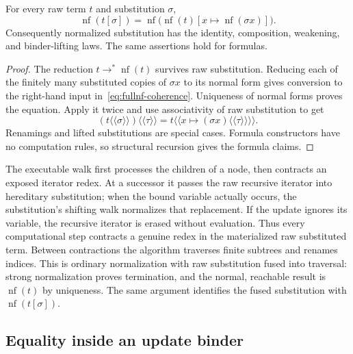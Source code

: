 \begin{lemma}
\label{lem:fullnf-substitution}
For every raw term $t$ and substitution $\sigma$,
\begin{equation}
 \operatorname{nf}(t[\sigma])
 =\operatorname{nf}\bigl(\operatorname{nf}(t)
                     [x\mapsto\operatorname{nf}(\sigma x)]\bigr).
\label{eq:fullnf-coherence}
\end{equation}
Consequently normalized substitution has the identity, composition,
weakening, and binder-lifting laws.  The same assertions hold for formulas.
\end{lemma}
\begin{proof}
The reduction $t\longrightarrow^*\operatorname{nf}(t)$ survives raw
substitution.  Reducing each of the finitely many substituted copies of
$\sigma x$ to its normal form gives conversion to the right-hand input
in~\eqref{eq:fullnf-coherence}.  Uniqueness of normal forms proves the
equation.  Apply it twice and use associativity of raw substitution to get
\[
 (t\langle\!\langle\sigma\rangle\!\rangle)
       \langle\!\langle\tau\rangle\!\rangle
 =t\langle\!\langle
          x\mapsto(\sigma x)\langle\!\langle\tau\rangle\!\rangle
       \rangle\!\rangle.
\]
Renamings and lifted substitutions are special cases.  Formula constructors
have no computation rules, so structural recursion gives the formula claims.
\end{proof}

The executable walk first processes the children of a node, then contracts
an exposed iterator redex.  At a successor it passes the raw recursive
iterator into hereditary substitution; when the bound variable actually
occurs, the substitution's shifting walk normalizes that replacement.
If the update ignores its variable, the recursive iterator is erased
without evaluation.  Thus every computational step contracts a genuine
redex in the materialized raw substituted term.  Between contractions the
algorithm traverses finite subtrees and renames indices.  This is ordinary
normalization with raw substitution fused into traversal: strong
normalization proves termination, and the normal, reachable result is
$\operatorname{nf}(t)$ by uniqueness.  The same argument identifies the
fused substitution with $\operatorname{nf}(t[\sigma])$.

\subsection{Equality inside an update binder}

